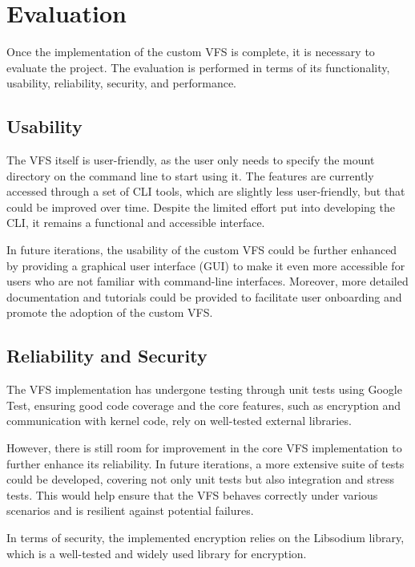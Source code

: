 \chapter{Evaluation}\label{chap:evaluation}

Once the implementation of the custom VFS is complete, it is necessary to evaluate the project.
The evaluation is performed in terms of its functionality, usability, reliability, security, and performance.


\section{Usability}\label{sec:usability}

The VFS itself is user-friendly, as the user only needs to specify the mount directory on the command line to start using it.
The features are currently accessed through a set of CLI tools, which are slightly less user-friendly, but that could be improved over time.
Despite the limited effort put into developing the CLI, it remains a functional and accessible interface.

In future iterations, the usability of the custom VFS could be further enhanced by providing a graphical user interface (GUI) to make it even more accessible for users who are not familiar with command-line interfaces.
Moreover, more detailed documentation and tutorials could be provided to facilitate user onboarding and promote the adoption of the custom VFS\@.


\section{Reliability and Security}\label{sec:reliability-and-security}

The VFS implementation has undergone testing through unit tests using Google Test, ensuring good code coverage and the core features, such as encryption and communication with kernel code, rely on well-tested external libraries.

However, there is still room for improvement in the core VFS implementation to further enhance its reliability.
In future iterations, a more extensive suite of tests could be developed, covering not only unit tests but also integration and stress tests.
This would help ensure that the VFS behaves correctly under various scenarios and is resilient against potential failures.

In terms of security, the implemented encryption relies on the Libsodium library, which is a well-tested and widely used library for encryption.


